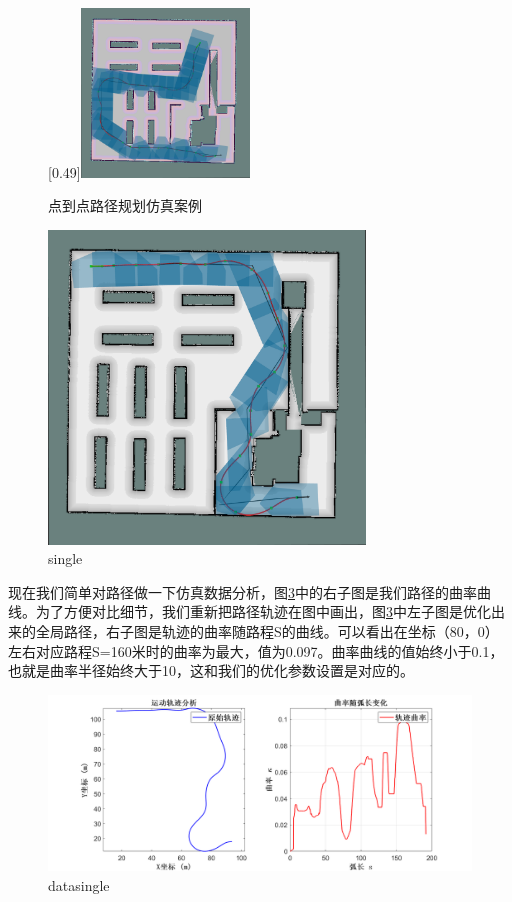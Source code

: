 \documentclass[master,academic]{ysuthesis} %
\begin{document}
\begin{figure}[!ht]
			[0.49\textwidth]{\includegraphics[width=0.4\textwidth]{single_4.png}}
			\caption{点到点路径规划仿真案例}
			\label{fig:点到点路径规划仿真案例}
		\end{figure}

		\begin{figure}[!ht]
			\centering
			\includegraphics[width=0.75\textwidth]{single.png}
			\caption{single}
			\label{fig:single}
		\end{figure}

		现在我们简单对路径做一下仿真数据分析，图\ref{fig:datasingle}中的右子图是我们路径的曲率曲线。为了方便对比细节，我们重新把路径轨迹在图中画出，图\ref{fig:datasingle}中左子图是优化出来的全局路径，右子图是轨迹的曲率随路程S的曲线。可以看出在坐标（80，0）左右对应路程S=160米时的曲率为最大，值为0.097。曲率曲线的值始终小于0.1，也就是曲率半径始终大于10，这和我们的优化参数设置是对应的。
		\begin{figure}[!ht]
			\centering
			\includegraphics[width=1\textwidth]{datasingle.png}
			\caption{datasingle}
			\label{fig:datasingle}
		\end{figure}
\end{document}
